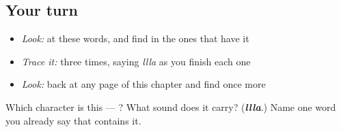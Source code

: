 \subsection*{Your turn}
\begin{itemize}
\raggedright
  \item \emph{Look:} at these words, and find  in the ones that have it
\end{itemize}

\begin{quote}
\end{quote}

\begin{itemize}
\raggedright
  \item \emph{Trace it:}  three times, saying \emph{llla} as you finish each one
  \item \emph{Look:} back at any page of this chapter and find  once more
\end{itemize}

\begin{tcolorbox}[breakable,colback=teal!4,colframe=teal!35!black,title={Before you move on}]
Which character is this — ? What sound does it carry? (\emph{\textbf{llla}}.) Name one word you already say that contains it.
\end{tcolorbox}
